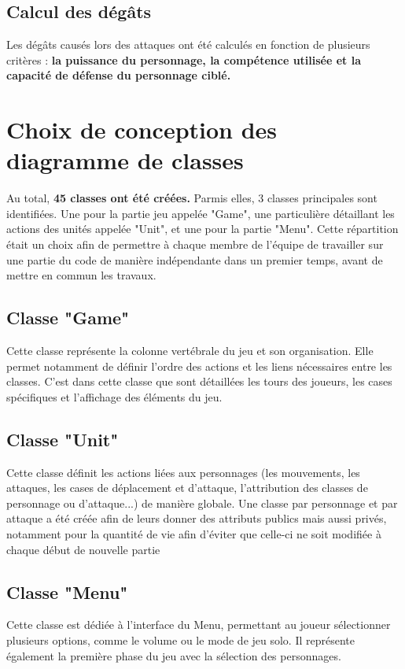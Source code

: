 \documentclass{article}
\begin{document}
\subsection{Calcul des dégâts}
Les dégâts causés lors des attaques ont été calculés en fonction de plusieurs critères : \textbf{la puissance du personnage, la compétence utilisée et la capacité de défense du personnage ciblé.}

\section{Choix de conception des diagramme de classes}
Au total, \textbf{45 classes ont été créées.} Parmis elles, 3 classes principales sont identifiées. Une pour la partie jeu appelée "Game", une particulière détaillant les actions des unités appelée "Unit", et une pour la partie "Menu". Cette répartition était un choix afin de permettre à chaque membre de l'équipe de travailler sur une partie du code de manière indépendante dans un premier temps, avant de mettre en commun les travaux.
\subsection{Classe "Game"}
Cette classe représente la colonne vertébrale du jeu et son organisation. Elle permet notamment de définir l'ordre des actions et les liens nécessaires entre les classes. C'est dans cette classe que sont détaillées les tours des joueurs, les cases spécifiques et l'affichage des éléments du jeu.
\subsection{Classe "Unit"}
Cette classe définit les actions liées aux personnages (les mouvements, les attaques, les cases de déplacement et d'attaque, l'attribution des classes de personnage ou d'attaque...) de manière globale. Une classe par personnage et par attaque a été créée afin de leurs donner des attributs publics mais aussi privés, notamment pour la quantité de vie afin d'éviter que celle-ci ne soit modifiée à chaque début de nouvelle partie
\subsection{Classe "Menu"}
Cette classe est dédiée à l'interface du Menu, permettant au joueur sélectionner plusieurs options, comme le volume ou le mode de jeu solo. Il représente également la première phase du jeu avec la sélection des personnages.
\end{document}
